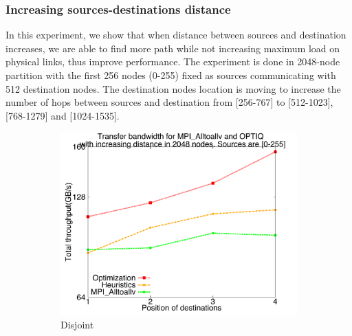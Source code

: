 \subsubsection{Increasing sources-destinations distance}

In this experiment, we show that when distance between sources and destination increases, we are able to find more path while not increasing maximum load on physical links, thus improve performance. The experiment is done in 2048-node partition with the first 256 nodes (0-255) fixed as sources communicating with 512 destination nodes. The destination nodes location is moving to increase the number of hops between sources and destination from [256-767] to [512-1023], [768-1279] and [1024-1535].

\begin{figure}[!htbp]
        \centering
        \begin{subfigure}[b]{0.32\textwidth}
                \includegraphics[width=\textwidth]{figures/incrdist_disjoint.pdf}
                \caption{Disjoint}
                \label{fig:incrdist_disjoint}
        \end{subfigure}%
        ~ %
        \begin{subfigure}[b]{0.32\textwidth}

\end{subfigure}
\end{figure}
